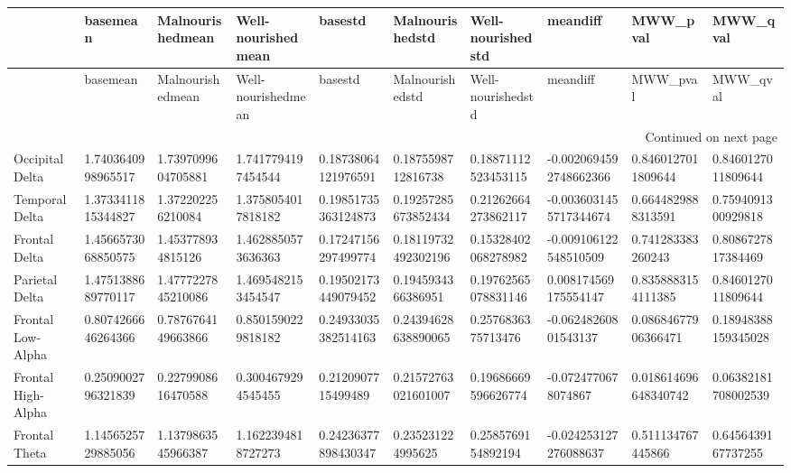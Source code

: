 \begin{longtable}{llllllllll}
\toprule
{} &              basemean &      Malnourishedmean &     Well-nourishedmean &              basestd &      Malnourishedstd &    Well-nourishedstd &                meandiff &                MWW\_pval &              MWW\_qval \\
\midrule
\endfirsthead

\toprule
{} &              basemean &      Malnourishedmean &     Well-nourishedmean &              basestd &      Malnourishedstd &    Well-nourishedstd &                meandiff &                MWW\_pval &              MWW\_qval \\
\midrule
\endhead
\midrule
\multicolumn{10}{r}{{Continued on next page}} \\
\midrule
\endfoot

\bottomrule
\endlastfoot
Occipital Delta      &    1.7403640998965517 &    1.7397099604705881 &     1.7417794197454544 &  0.18738064121976591 &   0.1875598712816738 &  0.18871112523453115 &  -0.0020694592748662366 &      0.8460127011809644 &    0.8460127011809644 \\
Temporal Delta       &    1.3733411815344827 &     1.372202256210084 &     1.3758054017818182 &  0.19851735363124873 &  0.19257285673852434 &  0.21262664273862117 &  -0.0036031455717344674 &      0.6644829888313591 &    0.7594091300929818 \\
Frontal Delta        &    1.4566573068850575 &     1.453778934815126 &     1.4628850573636363 &  0.17247156297499774 &  0.18119732492302196 &  0.15328402068278982 &   -0.009106122548510509 &       0.741283383260243 &    0.8086727817384469 \\
Parietal Delta       &    1.4751388689770117 &    1.4777227845210086 &     1.4695482153454547 &  0.19502173449079452 &   0.1945934366386951 &  0.19762565078831146 &    0.008174569175554147 &      0.8358883154111385 &    0.8460127011809644 \\
Frontal Low-Alpha    &    0.8074266646264366 &    0.7876764149663866 &     0.8501590229818182 &  0.24933035382514163 &  0.24394628638890065 &   0.2576836375713476 &    -0.06248260801543137 &     0.08684677906366471 &   0.18948388159345028 \\
Frontal High-Alpha   &    0.2509002796321839 &    0.2279908616470588 &     0.3004679294545455 &   0.2120907715499489 &  0.21572763021601007 &  0.19686669596626774 &     -0.0724770678074867 &    0.018614696648340742 &   0.06382181708002539 \\
Frontal Theta        &    1.1456525729885056 &    1.1379863545966387 &     1.1622394818727273 &  0.24236377898430347 &    0.235231224995625 &   0.2585769154892194 &   -0.024253127276088637 &       0.511134767445866 &    0.6456439167737255 \\

\end{longtable}
